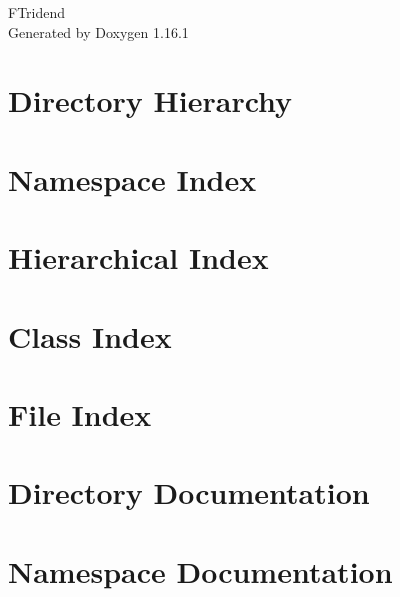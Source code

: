 \documentclass[twoside]{book}
\newcommand{\+}{\discretionary{\mbox{\scriptsize$\hookleftarrow$}}{}{}}
\newcommand{\clearemptydoublepage}{%
    \newpage{\pagestyle{empty}\cleardoublepage}%
  }
\begin{document}
  \raggedbottom
    \hypersetup{pageanchor=false,
                bookmarksnumbered=true,
                pdfencoding=unicode
               }
  \begin{titlepage}
  \vspace*{7cm}
  \begin{center}%
  {\Large FTridend}\\
  \vspace*{1cm}
  {\large Generated by Doxygen 1.16.1}\\
  \end{center}
  \end{titlepage}
  \clearemptydoublepage
  \tableofcontents
  \clearemptydoublepage
  \hypersetup{pageanchor=true}
\chapter{Directory Hierarchy}

\chapter{Namespace Index}

\chapter{Hierarchical Index}

\chapter{Class Index}

\chapter{File Index}

\chapter{Directory Documentation}







\chapter{Namespace Documentation}

\end{document}
